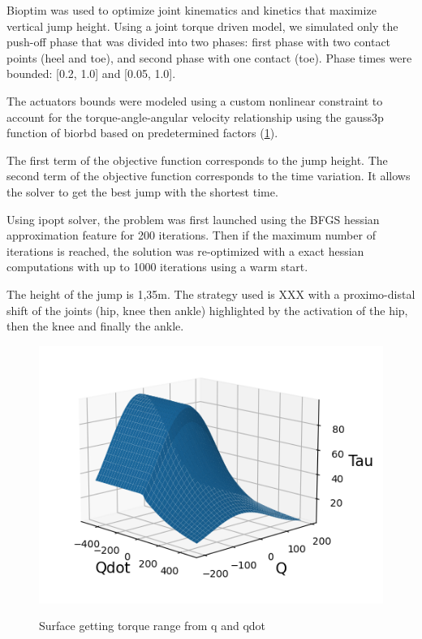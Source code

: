 Bioptim was used to optimize joint kinematics and kinetics that maximize vertical jump height.
Using a joint torque driven model, we simulated only the push-off phase that was divided into two phases:
first phase with two contact points (heel and toe),
and second phase with one contact (toe). Phase times were bounded: [0.2, 1.0] and [0.05, 1.0].

The actuators bounds were modeled using a custom nonlinear constraint to account for the torque-angle-angular
velocity relationship using the gauss3p function of biorbd based on predetermined factors
(\ref{fig:graph_force_vitesse_longueur}).

The first term of the objective function corresponds to the jump height.
The second term of the objective function corresponds to the time variation.
It allows the solver to get the best jump with the shortest time.

Using ipopt solver, the problem was first launched using the BFGS hessian approximation feature for 200 iterations.
Then if the maximum number of iterations is reached,
the solution was re-optimized with a exact hessian computations with up to 1000 iterations using a warm start.

The height of the jump is 1,35m.
The strategy used is XXX with a proximo-distal shift of the joints (hip, knee then ankle) highlighted by the
activation of the hip, then the knee and finally the ankle.

\begin{figure}[t!]
\includegraphics[width=\textwidth/2]{figures/graph_force_vitesse_longueur.png}\\
\caption{Surface getting torque range from q and qdot}
\label{fig:graph_force_vitesse_longueur}
\end{figure}
